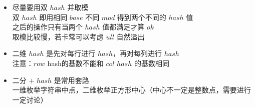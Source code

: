 \documentclass[E:/GsjzTle/main/main.tex]{subfiles}
\begin{document}
\begin{itemize}
\item
  尽量要用双 \(hash\) 并取模\\
  双 \(hash\) 即用相同 \(base\) 不同 \(mod\) 得到两个不同的 \(hash\)
  值\\
  之后的操作只有当两个 \(hash\) 值都满足才算 \(ok\)\\
  取模比较慢，若卡常可以考虑 \(ull\) 自然溢出
\item
  二维 \(hash\) 是先对每行进行 \(hash\)，再对每列进行 \(hash\)\\
  注意：\(row\) hash的基数不能和 \(col\) \(hash\) 的基数相同
\item
  二分 \(+\) \(hash\) 是常用套路\\
  一维枚举字符串中点，二维枚举正方形中心（中心不一定是整数点，需要进行一定讨论）
\end{itemize}
\end{document}
